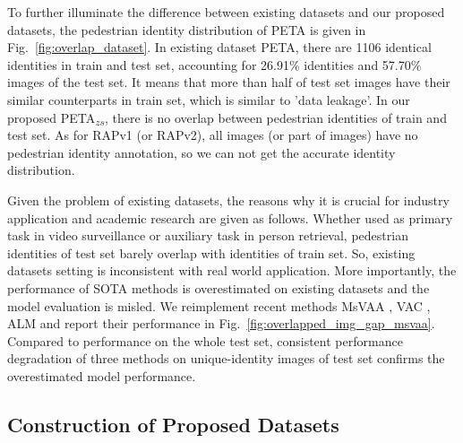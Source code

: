 \documentclass[runningheads]{llncs}
\begin{document}
To further illuminate the difference between existing datasets and our proposed datasets, the pedestrian identity distribution of PETA is given in Fig.~\ref{fig:overlap_dataset}. In existing dataset PETA, there are 1106 identical identities in train and test set, accounting for 26.91\% identities and 57.70\% images of the test set. It means that more than half of test set images have their similar counterparts in train set, which is similar to 'data leakage'. In our proposed PETA\textsubscript{$zs$}, there is no overlap between pedestrian identities of train and test set. As for RAPv1 (or RAPv2), all images (or part of images) have no pedestrian identity annotation, so we can not get the accurate identity distribution.

Given the problem of existing datasets, the reasons why it is crucial for industry application and academic research are given as follows. Whether used as primary task in video surveillance or auxiliary task in person retrieval, pedestrian identities of test set barely overlap with identities of train set. So, existing datasets setting is inconsistent with real world application. 
More importantly, the performance of SOTA methods is overestimated on existing datasets and the model evaluation is misled. 
We reimplement recent methods MsVAA \cite{sarafianos2018deep}, VAC \cite{guo2019visual}, ALM \cite{tang2019Improving} and report their performance in Fig.~\ref{fig:overlapped_img_gap_msvaa}. Compared to performance on the whole test set, consistent performance degradation of three methods on unique-identity images of test set confirms the overestimated model performance.

\subsection{Construction of Proposed Datasets}
\end{document}
